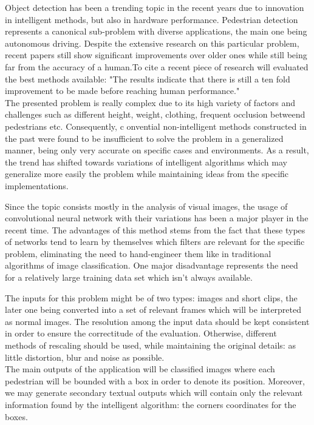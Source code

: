 \documentclass[runningheads,a4paper,11pt]{report}
\begin{document}
Object detection has been a trending topic in the recent years due to innovation in intelligent methods, but also in hardware performance. Pedestrian detection represents a canonical sub-problem with diverse applications, the main one being autonomous driving. Despite the extensive research on this particular problem, recent papers still show significant improvements over older ones while still being far from the accuracy of a human.To cite a recent piece of research will evaluated the best methods available: "The results indicate that there is still a ten fold improvement to be made before reaching human performance." \\
The presented problem is really complex due to its high variety of factors and challenges such as different height, weight, clothing, frequent occlusion betweend pedestrians etc. Consequently, c onvential non-intelligent methods constructed in the past were found to be insufficient to solve the problem in a generalized manner, being only very accurate on specific cases and environments. As a result, the trend has shifted towards variations of intelligent algorithms which may generalize more easily the problem while maintaining ideas from the specific implementations.

Since the topic consists mostly in the analysis of visual images, the usage of convolutional neural network with their variations has been a major player in the recent time. The advantages of this method stems from the fact that these types of networks tend to learn by themselves which filters are relevant for the specific problem, eliminating the need to hand-engineer them like in traditional algorithms of image classification. One major disadvantage represents the need for a relatively large training data set which isn't always available.



The inputs for this problem might be of two types: images and short clips, the later one being converted into a set of relevant frames which will be interpreted as normal images. The resolution among the input data should be kept consistent in order to ensure the correctitude of the evaluation. Otherwise, different methods of rescaling should be used, while maintaining the original details: as little distortion, blur and noise as possible. \\
The main outputs of the application will be classified images where each pedestrian will be bounded with a box in order to denote its position. Moreover, we may generate secondary textual outputs which will contain only the relevant information found by the intelligent algorithm: the corners coordinates for the boxes.
\end{document}
